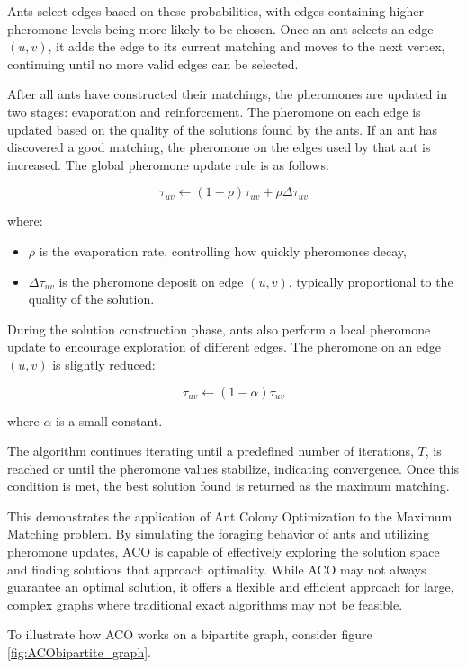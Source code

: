 Ants select edges based on these probabilities, with edges containing higher pheromone levels being more likely to be chosen. Once an ant selects an edge \( (u, v) \), it adds the edge to its current matching and moves to the next vertex, continuing until no more valid edges can be selected.

After all ants have constructed their matchings, the pheromones are updated in two stages: evaporation and reinforcement. The pheromone on each edge is updated based on the quality of the solutions found by the ants. If an ant has discovered a good matching, the pheromone on the edges used by that ant is increased. The global pheromone update rule is as follows:

\[
\tau_{uv} \leftarrow (1 - \rho) \tau_{uv} + \rho \Delta \tau_{uv}
\]

where:
\begin{itemize}
    \item \( \rho \) is the evaporation rate, controlling how quickly pheromones decay,
    \item \( \Delta \tau_{uv} \) is the pheromone deposit on edge \( (u, v) \), typically proportional to the quality of the solution.
\end{itemize}

During the solution construction phase, ants also perform a local pheromone update to encourage exploration of different edges. The pheromone on an edge \( (u, v) \) is slightly reduced:

\[
\tau_{uv} \leftarrow (1 - \alpha) \tau_{uv}
\]

where \( \alpha \) is a small constant.

The algorithm continues iterating until a predefined number of iterations, \( T \), is reached or until the pheromone values stabilize, indicating convergence. Once this condition is met, the best solution found is returned as the maximum matching.

This demonstrates the application of Ant Colony Optimization to the Maximum Matching problem. By simulating the foraging behavior of ants and utilizing pheromone updates, ACO is capable of effectively exploring the solution space and finding solutions that approach optimality. While ACO may not always guarantee an optimal solution, it offers a flexible and efficient approach for large, complex graphs where traditional exact algorithms may not be feasible.

To illustrate how ACO works on a bipartite graph, consider figure \ref{fig:ACObipartite_graph}. 

